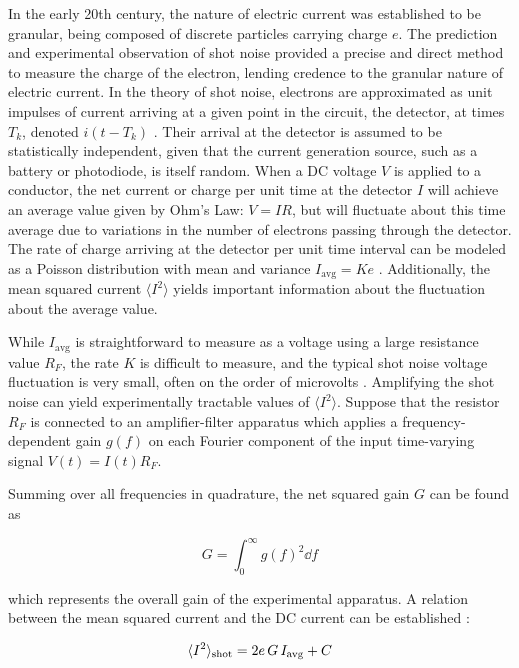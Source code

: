 \documentclass[aps,twocolumn,secnumarabic,balancelastpage,amsmath,amssymb,nofootinbib,floatfix]{revtex4-1}
\begin{document}
In the early 20th century, the nature of electric current was established to be granular, being composed of discrete particles carrying charge $e$. The prediction and experimental observation of shot noise provided a precise and direct method to measure the charge of the electron, lending credence to the granular nature of electric current. In the theory of shot noise, electrons are approximated as unit impulses of current arriving at a given point in the circuit, the detector, at times $T_k$, denoted $i(t-T_k)$ \cite{mit_johnson_shot_noise_2023}. Their arrival at the detector is assumed to be statistically independent, given that the current generation source, such as a battery or photodiode, is itself random. When a DC voltage $V$ is applied to a conductor, the net current or charge per unit time at the detector $I$ will achieve an average value given by Ohm's Law: $V = IR$, but will fluctuate about this time average due to variations in the number of electrons passing through the detector. The rate of charge arriving at the detector per unit time interval can be modeled as a Poisson distribution with mean and variance $I_{\text{avg}} = Ke$ \cite{mit_johnson_shot_noise_2023}. Additionally, the mean squared current $\langle I^2 \rangle$ yields important information about the fluctuation about the average value.

While $I_{\text{avg}}$ is straightforward to measure as a voltage  using a large resistance value $R_F$,  the rate $K$ is difficult to measure, and the typical shot noise voltage fluctuation is very small, often on the order of microvolts \cite{mit_johnson_shot_noise_2023}. Amplifying the shot noise can yield experimentally tractable values of  $\langle I^2 \rangle$. Suppose that the resistor $R_F$ is connected to an amplifier-filter apparatus which applies a frequency-dependent gain $g(f)$ on each Fourier component of the input time-varying signal $V(t) = I(t)R_F$. 

Summing over all frequencies in quadrature, the net squared gain $G$ can be found as 

\begin{equation}
    G = \int_0^{\infty} g(f)^2 \dd f
\end{equation}

which represents the overall gain of the experimental apparatus. A relation between the mean squared current and the DC current can be established \cite{mit_johnson_shot_noise_2023}: 

\begin{equation}
    \langle I^2 \rangle_{\rm shot} = 2e\, G\, I_{\rm avg} + C
    \label{eq:shot-noise}
\end{equation}
\end{document}
